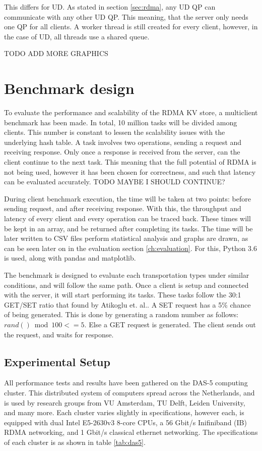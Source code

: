 This differs for UD.
As stated in section \ref{sec:rdma}, any UD QP can communicate with any other UD QP.
This meaning, that the server only needs one QP for all clients.
A worker thread is still created for every client, however, in the case of UD, all threads use a shared queue.

TODO ADD MORE GRAPHICS


\section{Benchmark design}\label{sec:benchmark-design}
To evaluate the performance and scalability of the RDMA KV store, a multiclient benchmark has been made.
In total, 10 million tasks will be divided among clients.
This number is constant to lessen the scalability issues with the underlying hash table.
A task involves two operations, sending a request and receiving response.
Only once a response is received from the server, can the client continue to the next task.
This meaning that the full potential of RDMA is not being used, however it has been chosen for correctness, and such that latency can be evaluated accurately. TODO MAYBE I SHOULD CONTINUE?

During client benchmark execution, the time will be taken at two points: before sending request, and after receiving response.
With this, the throughput and latency of every client and every operation can be traced back.
These times will be kept in an array, and be returned after completing its tasks.
The time will be later written to CSV files perform statistical analysis and graphs are drawn, as can be seen later on in the evaluation section \ref{ch:evaluation}.
For this, Python 3.6\cite{python} is used, along with pandas\cite{pandas} and matplotlib\cite{matplotlib}.

The benchmark is designed to evaluate each transportation types under similar conditions, and will follow the same path.
Once a client is setup and connected with the server, it will start performing its tasks.
These tasks follow the 30:1 GET/SET ratio that found by Atikoglu et. al.\cite{atikoglu2012workload}.
A SET request has a 5\% chance of being generated.
This is done by generating a random number as follows: $rand() \bmod 100 <= 5$.
Else a GET request is generated.
The client sends out the request, and waits for response.

\subsection{Experimental Setup}
All performance tests and results have been gathered on the DAS-5 computing cluster\cite{das5}.
This distributed system of computers spread across the Netherlands, and is used by research groups from VU Amsterdam, TU Delft, Leiden University, and many more.
Each cluster varies slightly in specifications, however each, is equipped with dual Intel E5-2630v3 8-core CPUs, a 56 Gbit/s Inifiniband (IB) RDMA networking, and 1 Gbit/s classical ethernet networking.
The specifications of each cluster is as shown in table \ref{tab:das5}.


